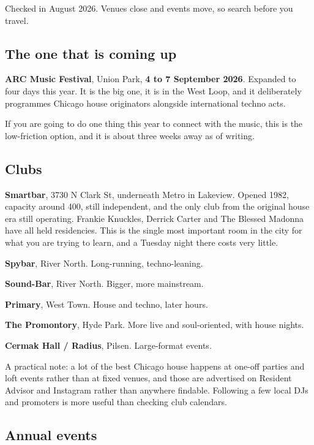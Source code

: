 Checked in August 2026. Venues close and events move, so search before you travel.

\subsection{The one that is coming up}\label{li02_scene-the-one-that-is-coming-up}

\textbf{ARC Music Festival}, Union Park, \textbf{4 to 7 September 2026}. Expanded to four days this
year. It is the big one, it is in the West Loop, and it deliberately programmes Chicago house
originators alongside international techno acts.

If you are going to do one thing this year to connect with the music, this is the
low-friction option, and it is about three weeks away as of writing.

\subsection{Clubs}\label{li02_scene-clubs}

\textbf{Smartbar}, 3730 N Clark St, underneath Metro in Lakeview. Opened 1982, capacity around
400, still independent, and the only club from the original house era still operating. Frankie
Knuckles, Derrick Carter and The Blessed Madonna have all held residencies. This is the
single most important room in the city for what you are trying to learn, and a Tuesday night
there costs very little.

\textbf{Spybar}, River North. Long-running, techno-leaning.

\textbf{Sound-Bar}, River North. Bigger, more mainstream.

\textbf{Primary}, West Town. House and techno, later hours.

\textbf{The Promontory}, Hyde Park. More live and soul-oriented, with house nights.

\textbf{Cermak Hall / Radius}, Pilsen. Large-format events.

A practical note: a lot of the best Chicago house happens at one-off parties and loft events
rather than at fixed venues, and those are advertised on Resident Advisor and Instagram
rather than anywhere findable. Following a few local DJs and promoters is more useful than
checking club calendars.

\subsection{Annual events}\label{li02_scene-annual-events}

